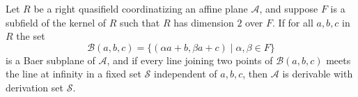 Let $R$ be a right quasifield coordinatizing an affine plane $\mathcal{A}$, and suppose $F$ is a subfield of the kernel of $R$ such that $R$ has dimension $2$ over $F$. If for all $a,b,c$ in $R$ the set
$$\mathcal{B}(a,b,c) = \{(\alpha a + b, \beta a + c) \mid \alpha, \beta \in F\}$$
is a Baer subplane of $\mathcal{A}$, and if every line joining two points of $\mathcal{B}(a,b,c)$ meets the line at infinity in a fixed set $\mathcal{S}$ independent of $a,b,c$, then $\mathcal{A}$ is derivable with derivation set $\mathcal{S}$.
